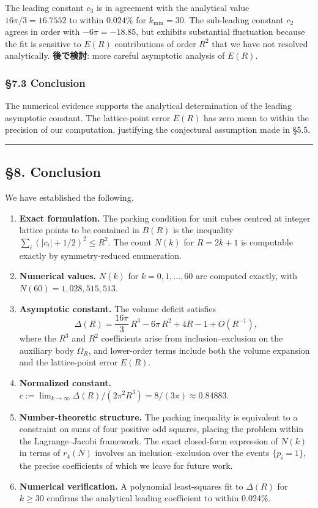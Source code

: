 \documentclass[a4paper,11pt]{article}
\theoremstyle{definition}
\begin{document}
The leading constant \(c_3\) is in agreement with the analytical value
\(16\pi/3 = 16.7552\) to within \(0.024\%\) for \(k_{\min} = 30\). The
sub-leading constant \(c_2\) agrees in order with \(-6\pi = -18.85\),
but exhibits substantial fluctuation because the fit is sensitive to
\(E(R)\) contributions of order \(R^2\) that we have not resolved
analytically. \textbf{後で検討}: more careful asymptotic analysis of
\(E(R)\).

\subsubsection{§7.3 Conclusion}\label{conclusion}

The numerical evidence supports the analytical determination of the
leading asymptotic constant. The lattice-point error \(E(R)\) has zero
mean to within the precision of our computation, justifying the
conjectural assumption made in §5.5.

\begin{center}\rule{0.5\linewidth}{0.5pt}\end{center}

\subsection{§8. Conclusion}\label{conclusion-1}

We have established the following.

\begin{enumerate}
\def\labelenumi{\arabic{enumi}.}
\item
  \textbf{Exact formulation.} The packing condition for unit cubes
  centred at integer lattice points to be contained in \(B(R)\) is the
  inequality \(\sum_i (|c_i|+1/2)^2 \le R^2\). The count \(N(k)\) for
  \(R = 2k+1\) is computable exactly by symmetry-reduced enumeration.
\item
  \textbf{Numerical values.} \(N(k)\) for \(k = 0, 1, \ldots, 60\) are
  computed exactly, with \(N(60) = 1,028,515,513\).
\item
  \textbf{Asymptotic constant.} The volume deficit satisfies
  \[\Delta(R) = \frac{16\pi}{3}\, R^3 - 6\pi\, R^2 + 4R - 1 + O(R^{-1}),\]
  where the \(R^3\) and \(R^2\) coefficients arise from
  inclusion--exclusion on the auxiliary body \(\Omega_R\), and
  lower-order terms include both the volume expansion and the
  lattice-point error \(E(R)\).
\item
  \textbf{Normalized constant.}
  \(c := \lim_{k \to \infty} \Delta(R)/(2\pi^2 R^3) = 8/(3\pi) \approx 0.84883\).
\item
  \textbf{Number-theoretic structure.} The packing inequality is
  equivalent to a constraint on sums of four positive odd squares,
  placing the problem within the Lagrange--Jacobi framework. The exact
  closed-form expression of \(N(k)\) in terms of \(r_4(N)\) involves an
  inclusion--exclusion over the events \(\{p_i = 1\}\), the precise
  coefficients of which we leave for future work.
\item
  \textbf{Numerical verification.} A polynomial least-squares fit to
  \(\Delta(R)\) for \(k \ge 30\) confirms the analytical leading
  coefficient to within \(0.024\%\).
\end{enumerate}
\end{document}
